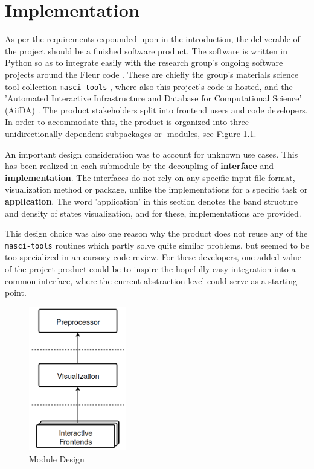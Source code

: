 
\chapter{Implementation}
\label{chap:implementation}


As per the requirements expounded upon in the introduction, the deliverable of
the project should be a finished software product. The software is written in
Python so as to integrate easily with the research group's ongoing software
projects around the Fleur code \cite{fleur}. These are chiefly the group's
materials science tool collection \texttt{masci-tools} \cite{masci-tools} ,
where also this project's code is hosted, and the 'Automated Interactive
Infrastructure and Database for Computational Science' (AiiDA) \cite{aiida}. The
product stakeholders split into frontend users and code developers. In order to
accommodate this, the product is organized into three unidirectionally dependent
subpackages or -modules, see Figure \ref{fig:modules}.

An important design consideration was to account for unknown use cases. This has
been realized in each submodule by the decoupling of \textbf{interface} and
\textbf{implementation}. The interfaces do not rely on any specific input file
format, visualization method or package, unlike the implementations for a
specific task or \textbf{application}. The word 'application' in this section
denotes the band structure and density of states visualization, and for these,
implementations are provided.

This design choice was also one reason why the product does not reuse any of the
\texttt{masci-tools} routines which partly solve quite similar problems, but
seemed to be too specialized in an cursory code review. For these developers,
one added value of the project product could be to inspire the hopefully easy
integration into a common interface, where the current abstraction level could
serve as a starting point.

\begin{figure}
    \centering
    \includegraphics[width=0.38\textwidth]{img/module_design.png}
    \caption{Module Design}
    \label{fig:modules}
\end{figure}

